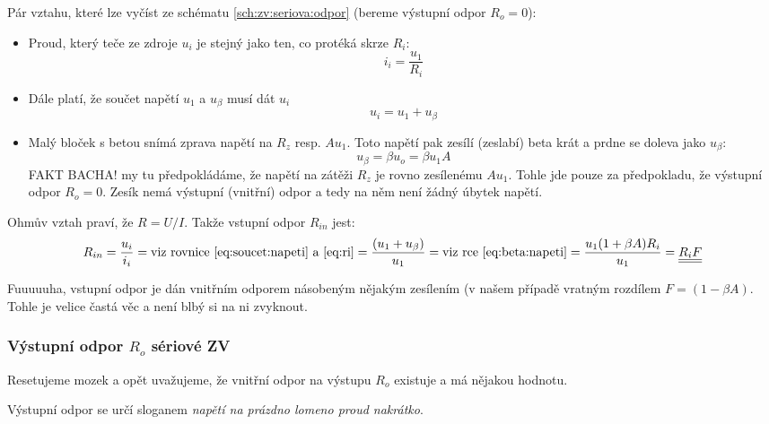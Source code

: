 \documentclass[a4paper,12pt]{article}   %
\begin{document}
Pár vztahu, které lze vyčíst ze schématu \ref{sch:zv:seriova:odpor} (bereme výstupní odpor $R_o = 0$):
\begin{itemize}
    \item Proud, který teče ze zdroje $u_i$ je stejný jako ten, co protéká skrze $R_i$:
    \begin{equation}
        i_i = \frac{u_\text{1}}{R_i}
        \label{eq:ri}
    \end{equation}
    \item Dále platí, že součet napětí $u_\text{1}$ a $u_\beta$ musí dát $u_i$
    \begin{equation}
        u_i = u_\text{1} + u_\beta
        \label{eq:soucet:napeti}
    \end{equation}
    \item Malý bloček s betou snímá zprava napětí na $R_z$ resp. $Au_\text{1}$. Toto napětí pak zesílí (zeslabí) beta krát a prdne se doleva jako $u_\beta$:
    \begin{equation}
        u_\beta = \beta u_o = \beta u_\text{1}A
        \label{eq:beta:napeti}
    \end{equation}
    FAKT BACHA! my tu předpokládáme, že napětí na zátěži $R_z$ je rovno zesílenému $Au_\text{1}$. Tohle jde pouze za předpokladu, že výstupní odpor $R_o = 0$. Zesík nemá výstupní (vnitřní) odpor a tedy na něm není žádný úbytek napětí.
\end{itemize}


Ohmův vztah praví, že $R=U/I$. Takže vstupní odpor $R_{in}$ jest:
\begin{equation}
    R_{in} = \frac{u_i}{i_i} = \text{viz rovnice \eqref{eq:soucet:napeti} a \eqref{eq:ri}} = \frac{(u_\text{1}+u_\beta)}{u_1} = \text{viz rce \eqref{eq:beta:napeti}} = \frac{u_\text{1}(1+\beta A)R_i}{u_\text{1}} = \underline{\underline{R_i F}}
\end{equation}

Fuuuuuha, vstupní odpor je dán vnitřním odporem násobeným nějakým zesílením (v našem případě vratným rozdílem $F=(1-\beta A)$. Tohle je velice častá věc a není blbý si na ni zvyknout.


\subsubsection{Výstupní odpor $R_o$ sériové ZV}

Resetujeme mozek a opět uvažujeme, že vnitřní odpor na výstupu $R_o$ existuje a má nějakou hodnotu.

Výstupní odpor se určí sloganem \textit{napětí na prázdno lomeno proud nakrátko}. 
\end{document}

